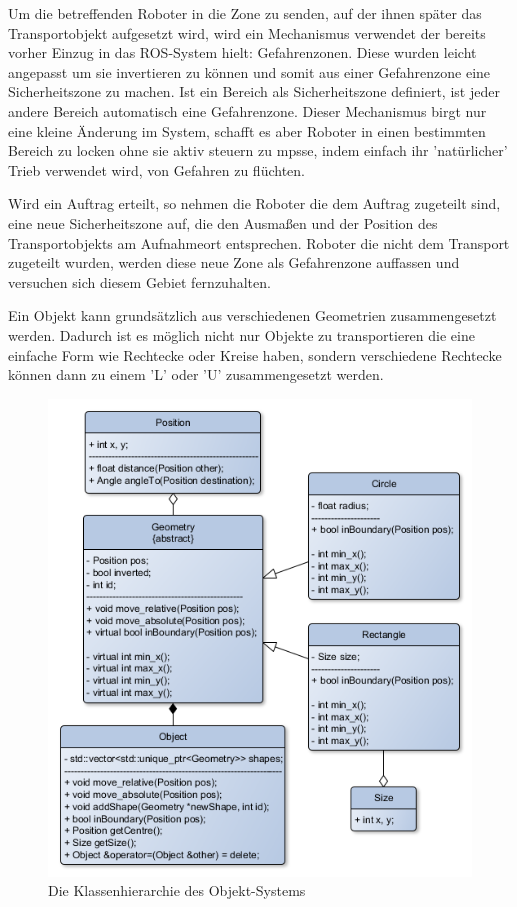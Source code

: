 Um die betreffenden Roboter in die Zone zu senden, auf der ihnen später das Transportobjekt aufgesetzt wird, wird ein Mechanismus verwendet der bereits vorher Einzug in das ROS-System hielt: Gefahrenzonen. Diese wurden leicht angepasst um sie invertieren zu können und somit aus einer Gefahrenzone eine Sicherheitszone zu machen. Ist ein Bereich als Sicherheitszone definiert, ist jeder andere Bereich automatisch eine Gefahrenzone.
Dieser Mechanismus birgt nur eine kleine Änderung im System, schafft es aber Roboter in einen bestimmten Bereich zu locken ohne sie aktiv steuern zu mpsse, indem einfach ihr 'natürlicher' Trieb verwendet wird, von Gefahren zu flüchten.

Wird ein Auftrag erteilt, so nehmen die Roboter die dem Auftrag zugeteilt sind, eine neue Sicherheitszone auf, die den Ausmaßen und der Position des Transportobjekts am Aufnahmeort entsprechen. Roboter die nicht dem Transport zugeteilt wurden, werden diese neue Zone als Gefahrenzone auffassen und versuchen sich diesem Gebiet fernzuhalten.

Ein Objekt kann grundsätzlich aus verschiedenen Geometrien zusammengesetzt werden. Dadurch ist es möglich nicht nur Objekte zu transportieren die eine einfache Form wie Rechtecke oder Kreise haben, sondern verschiedene Rechtecke können dann zu einem 'L' oder 'U' zusammengesetzt werden.

\begin{figure}
	\includegraphics[width=\pictureWidth,keepaspectratio]{graphics/Klassendiagramme/KlassendiagrammObject.png}
	\caption{Die Klassenhierarchie des Objekt-Systems}
	\label{pic:KlassendiagrammObject}
\end{figure}

